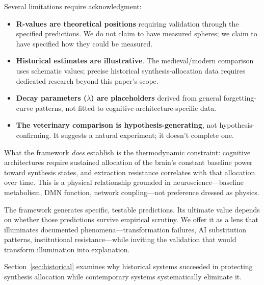 Several limitations require acknowledgment:

\begin{itemize}
    \item \textbf{R-values are theoretical positions} requiring validation through the specified predictions. We do not claim to have measured spheres; we claim to have specified how they could be measured.
    
    \item \textbf{Historical estimates are illustrative}. The medieval/modern comparison uses schematic values; precise historical synthesis-allocation data requires dedicated research beyond this paper's scope.
    
    \item \textbf{Decay parameters ($\lambda$) are placeholders} derived from general forgetting-curve patterns, not fitted to cognitive-architecture-specific data.
    
    \item \textbf{The veterinary comparison is hypothesis-generating}, not hypothesis-confirming. It suggests a natural experiment; it doesn't complete one.
\end{itemize}

What the framework \textit{does} establish is the thermodynamic constraint: cognitive architectures require sustained allocation of the brain's constant baseline power toward synthesis states, and extraction resistance correlates with that allocation over time. This is a physical relationship grounded in neuroscience—baseline metabolism, DMN function, network coupling—not preference dressed as physics.

The framework generates specific, testable predictions. Its ultimate value depends on whether those predictions survive empirical scrutiny. We offer it as a lens that illuminates documented phenomena—transformation failures, AI substitution patterns, institutional resistance—while inviting the validation that would transform illumination into explanation.

Section~\ref{sec:historical} examines why historical systems succeeded in protecting synthesis allocation while contemporary systems systematically eliminate it.

